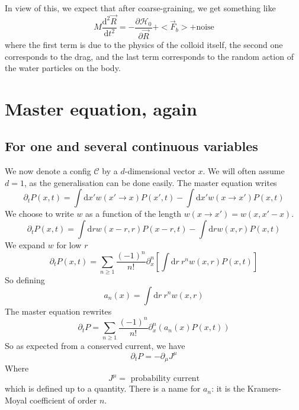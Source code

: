 \documentclass[a4paper]{book}
\theoremstyle{definition}
\theoremstyle{remark}
\begin{document}
In view of this, we expect that after coarse-graining, we get something like 
\begin{equation}
    M\frac{\text{d}^2\vec{R}}{\text{d} t^2} = -\frac{\partial \mathscr{H}_0}{\partial\vec{R}} + <\vec{F}_b> + \text{noise}
\end{equation}
where the first term is due to the physics of the colloid itself, the second one corresponds to the drag, and the last term corresponds to the random action of the water particles on the body. 

\section{Master equation, again}
\subsection{For one and several continuous variables}

We now denote a config $\mathscr{C}$ by a $d$-dimensional vector $x$. We will often assume $d=1$, as the generalisation can be done easily. The master equation writes
\begin{equation}
    \partial_t P(x, t) = \int \text{d}x' w(x' \rightarrow x) P(x', t) - \int \text{d}x' w(x \rightarrow x') P(x, t)
\end{equation}
We choose to write $w$ as a function of the length $w(x \rightarrow x') = w(x, x' - x)$.
\begin{equation}
    \partial_t P(x, t) = \int \text{d}r w(x-r, r) P(x-r, t) - \int \text{d}r w(x, r) P(x, t)
\end{equation}
We expand $w$ for low $r$
\begin{equation}
    \partial_t P(x, t) = \sum_{n\geq 1} \frac{(-1)^n}{n!} \partial^n_x \left[\int \text{d}r~ r^n w(x, r) P(x, t)\right]
\end{equation}
So defining 
\begin{equation}
    a_n(x) = \int \text{d}r ~ r^n w(x, r)
\end{equation}
The master equation rewrites 
\begin{equation}
    \partial_t P =  \sum_{n\geq 1} \frac{(-1)^n}{n!} \partial^n_x (a_n(x)P(x, t))
\end{equation}
So as expected from a conserved current, we have 
\begin{equation}
    \partial_t P = -\partial_\mu J^\mu
\end{equation}
Where 
\begin{equation}
    J^\mu = \text{ probability current}
\end{equation}
which is defined up to a quantity. There is a name for $a_n$: it is the Kramers-Moyal coefficient of order $n$. 
\end{document}
